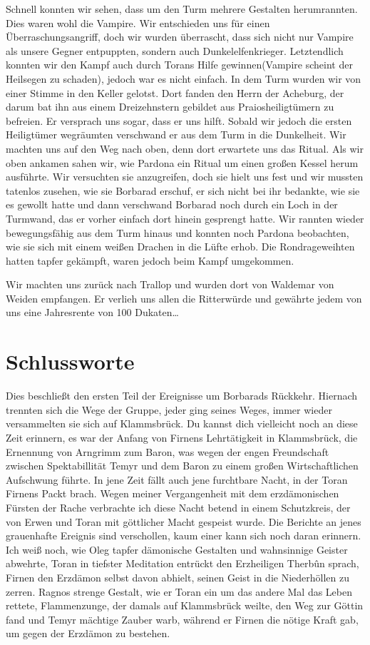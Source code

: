 Schnell konnten wir sehen, dass um den Turm mehrere Gestalten herumrannten. Dies waren wohl die Vampire. Wir entschieden uns für einen Überraschungsangriff, doch wir wurden überrascht, dass sich nicht nur Vampire als unsere Gegner entpuppten, sondern auch Dunkelelfenkrieger. Letztendlich konnten wir den Kampf auch durch Torans Hilfe gewinnen(Vampire scheint der Heilsegen zu schaden), jedoch war es nicht einfach. In dem Turm wurden wir von einer Stimme in den Keller gelotst. Dort fanden den Herrn der Acheburg, der darum bat ihn aus einem Dreizehnstern gebildet aus Praiosheiligtümern zu befreien. Er versprach uns sogar, dass er uns hilft. Sobald wir jedoch die ersten Heiligtümer wegräumten verschwand er aus dem Turm in die Dunkelheit. Wir machten uns auf den Weg nach oben, denn dort erwartete uns das Ritual. Als wir oben ankamen sahen wir, wie Pardona ein Ritual um einen großen Kessel herum ausführte. Wir versuchten sie anzugreifen, doch sie hielt uns fest und wir mussten tatenlos zusehen, wie sie Borbarad erschuf, er sich nicht bei ihr bedankte, wie sie es gewollt hatte und dann verschwand Borbarad noch durch ein Loch in der Turmwand, das er vorher einfach dort hinein gesprengt hatte. Wir rannten wieder bewegungsfähig aus dem Turm hinaus und konnten noch Pardona beobachten, wie sie sich mit einem weißen Drachen in die Lüfte erhob. Die Rondrageweihten hatten tapfer gekämpft, waren jedoch beim Kampf umgekommen.

Wir machten uns zurück nach Trallop und wurden dort von Waldemar von Weiden empfangen. Er verlieh uns allen die Ritterwürde und gewährte jedem von uns eine Jahresrente von 100 Dukaten\dots 

\chapter{Schlussworte}
Dies beschließt den ersten Teil der Ereignisse um Borbarads Rückkehr. Hiernach trennten sich die Wege der Gruppe, jeder ging seines Weges, immer wieder versammelten sie sich auf Klammsbrück. Du kannst dich vielleicht noch an diese Zeit erinnern, es war der Anfang von Firnens Lehrtätigkeit in Klammsbrück, die Ernennung von Arngrimm zum Baron, was wegen der engen Freundschaft zwischen Spektabillität Temyr und dem Baron zu einem großen Wirtschaftlichen Aufschwung führte. In jene Zeit fällt auch jene furchtbare Nacht, in der Toran Firnens Packt brach. Wegen meiner Vergangenheit mit dem erzdämonischen Fürsten der Rache verbrachte ich diese Nacht betend in einem Schutzkreis, der von Erwen und Toran mit göttlicher Macht gespeist wurde. Die Berichte an jenes grauenhafte Ereignis sind verschollen, kaum einer kann sich noch daran erinnern. Ich weiß noch, wie Oleg tapfer dämonische Gestalten und wahnsinnige Geister abwehrte, Toran in tiefster Meditation entrückt den Erzheiligen Therbûn sprach, Firnen den Erzdämon selbst davon abhielt, seinen Geist in die Niederhöllen zu zerren. Ragnos strenge Gestalt, wie er Toran ein um das andere Mal das Leben rettete, Flammenzunge, der damals auf Klammsbrück weilte, den Weg zur Göttin fand und Temyr mächtige Zauber warb, während er Firnen die nötige Kraft gab, um gegen der Erzdämon zu bestehen.

